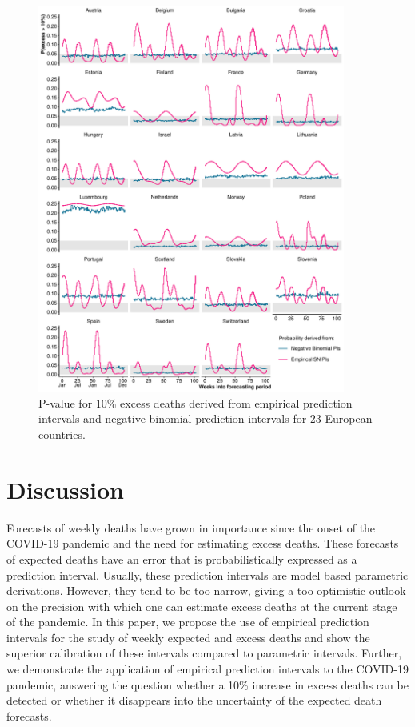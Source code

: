 \documentclass[12pt]{article}
\begin{document}
\begin{figure}[ht!]
    \centering
    \includegraphics[width=0.9\textwidth]{fig/22-pvalue10p_byregion.pdf}
     \caption{P-value for 10\% excess deaths derived from empirical prediction intervals and negative binomial prediction intervals for 23 European countries.}
     \label{fig:22-pvalue10p-byregion}
\end{figure}

\section*{Discussion}

Forecasts of weekly deaths have grown in importance since the onset of the COVID-19 pandemic and the need for estimating excess deaths. These forecasts of expected deaths have an error that is probabilistically expressed as a prediction interval. Usually, these prediction intervals are model based parametric derivations. However, they tend to be too narrow, giving a too optimistic outlook on the precision with which one can estimate excess deaths at the current stage of the pandemic. In this paper, we propose the use of empirical prediction intervals for the study of weekly expected and excess deaths and show the superior calibration of these intervals compared to parametric intervals. Further, we demonstrate the application of empirical prediction intervals to the COVID-19 pandemic, answering the question whether a 10\% increase in excess deaths can be detected or whether it disappears into the uncertainty of the expected death forecasts.
\end{document}
